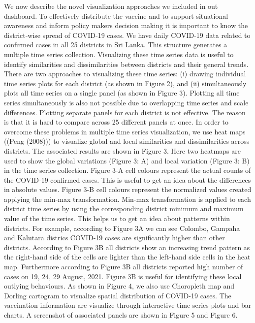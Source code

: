 \documentclass[
]{article}
\begin{document}
We now describe the novel visualization approaches we included in out
dashboard. To effectively distribute the vaccine and to support
situational awareness and inform policy makers decision making it is
important to know the district-wise spread of COVID-19 cases. We have
daily COVID-19 data related to confirmed cases in all 25 districts in
Sri Lanka. This structure generates a multiple time series collection.
Visualizing these time series data is useful to identify similarities
and dissimilarities between districts and their general trends. There
are two approaches to visualizing these time series: (i) drawing
individual time series plots for each district (as shown in Figure 2),
and (ii) simultaneously plots all time series on a single panel (as
shown in Figure 3). Plotting all time series simultaneously is also not
possible due to overlapping time series and scale differences. Plotting
separate panels for each district is not effective. The reason is that
it is hard to compare across 25 different panels at once. In order to
overcome these problems in multiple time series visualization, we use
heat maps ((Peng (2008))) to visualize global and local similarities and
dissimilarities across districts. The associated results are shown in
Figure 3. Here two heatmaps are used to show the global variations
(Figure 3: A) and local variation (Figure 3: B) in the time series
collection. Figure 3-A cell colours represent the actual counts of the
COVID-19 confirmed cases. This is useful to get an idea about the
differences in absolute values. Figure 3-B cell colours represent the
normalized values created applying the min-max transformation. Min-max
transformation is applied to each district time series by using the
corresponding district minimum and maximum value of the time series.
This helps us to get an idea about patterns within districts. For
example, according to Figure 3A we can see Colombo, Gampaha and Kalutara
districs COVID-19 cases are significantly higher than other districts.
According to Figure 3B all districts show an increasing trend pattern as
the right-hand side of the cells are lighter than the left-hand side
cells in the heat map. Furthermore according to Figure 3B all districts
reported high number of cases on 19, 24, 29 August, 2021. Figure 3B is
useful for identifying these local outlying behaviours. As shown in
Figure 4, we also use Choropleth map and Dorling cartogram to visualize
spatial distribution of COVID-19 cases. The vaccination information are
visualize through interactive time series plots and bar charts. A
screenshot of associated panels are shown in Figure 5 and Figure 6.
\end{document}
